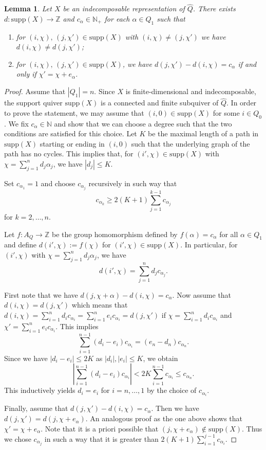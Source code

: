 \documentclass{amsart}
\newtheorem{lemma}[theorem]{Lemma}
\numberwithin{equation}{section}
\newcommand{\ZZ}{\mathbb{Z}}
\newcommand{\NN}{\mathbb{N}}
\begin{document}
\begin{lemma}
  \label{degreecondition} 
  Let $X$ be an indecomposable representation of $\hat Q$. There exists $d:\mathrm{supp} (X)\to\ZZ$ and $c_\alpha\in\mathbb N_+$ for each $\alpha\in Q_1$ such that
  \begin{enumerate}
    \item for $(i,\chi),\,(j,\chi')\in\mathrm{supp}(X)$ with $(i,\chi)\neq (j,\chi')$ we have $d(i,\chi)\ne d(j,\chi')$;
    \item for $(i,\chi),\,(j,\chi')\in\mathrm{supp}(X)$, we have $d(j,\chi')-d(i,\chi)=c_\alpha$ if and only if $\chi'=\chi+e_\alpha$.
  \end{enumerate}
\end{lemma}
\begin{proof}
  Assume that $|Q_1|=n$.
  Since $X$ is finite-dimensional and indecomposable, the support quiver $\mathrm{supp}(X)$ is a connected and finite subquiver of $\hat Q$.
  In order to prove the statement, we may assume that $(i,0)\in\mathrm{supp}(X)$ for some $i\in Q_0$.
  We fix $c_\alpha\in\NN$ and show that we can choose a degree such that the two conditions are satisfied for this choice.
  Let $K$ be the maximal length of a path in $\mathrm{supp}(X)$ starting or ending in $(i,0)$ such that the underlying graph of the path has no cycles.
  This implies that, for $(i',\chi)\in\mathrm{supp}(X)$ with $\chi=\sum_{j=1}^n d_j\alpha_j$, we have $|d_j|\leq K$.

  Set $c_{\alpha_1}=1$ and choose $c_{\alpha_j}$ recursively in such way that 
  \[c_{\alpha_k}\geq 2(K+1)\sum_{j=1}^{k-1} c_{\alpha_j}\]
  for $k=2,\ldots,n$.  

  Let $f:A_Q\to\ZZ$ be the group homomorphism defined by $f(\alpha)=c_\alpha$ for all $\alpha\in Q_1$ and define $d(i',\chi):=f(\chi)$ for $(i',\chi)\in\mathrm{supp}(X)$.
  In particular, for $(i',\chi)$ with $\chi=\sum_{j=1}^n d_j\alpha_j$, we have
  \[d(i',\chi)=\sum_{j=1}^n d_jc_{\alpha_j}.\]

  First note that we have $d(j,\chi+\alpha)-d(i,\chi)=c_\alpha$.
  Now assume that $d(i,\chi)=d(j,\chi')$ which means that $d(i,\chi)=\sum_{i=1}^n d_ic_{\alpha_i}=\sum_{i=1}^n e_ic_{\alpha_i}=d(j,\chi')$ if $\chi=\sum_{i=1}^n d_ic_{\alpha_i}$ and $\chi'=\sum_{i=1}^n e_ic_{\alpha_i}$.
  This implies
  \[\sum_{i=1}^{n-1}(d_i-e_i)c_{\alpha_i}=(e_{n}-d_{n})c_{\alpha_{n}}.\]
  Since we have $|d_i-e_i|\leq 2K$ as $|d_i|,|e_i|\leq K$, we obtain 
  \[|\sum_{i=1}^{n-1}(d_i-e_i)c_{\alpha_i}|<2K\sum_{i=1}^{n-1}c_{\alpha_i}\leq c_{\alpha_n}.\]
  This inductively yields $d_i=e_i$ for $i=n,\ldots,1$ by the choice of $c_{\alpha_i}$. 

  Finally, assume that $d(j,\chi')-d(i,\chi)=c_\alpha$.
  Then we have $d(j,\chi')=d(j,\chi+e_\alpha)$.
  An analogous proof as the one above shows that $\chi'=\chi+e_\alpha$.
  Note that it is a priori possible that $(j,\chi+e_\alpha)\notin\mathrm{supp}(X)$.
  Thus we chose $c_{\alpha_j}$ in such a way that it is greater than $2(K+1)\sum_{i=1}^{j-1}c_{\alpha_i}$. 
\end{proof}
\end{document}
